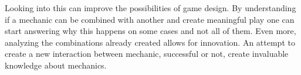 Looking into this can improve the possibilities of game design. By understanding if a mechanic can be combined with another and create meaningful play one can start answering why this happens on some cases and not all of them. Even more, analyzing the combinations already created allows for innovation. An attempt to create a new interaction between mechanic, successful or not, create invaluable knowledge about mechanics.
